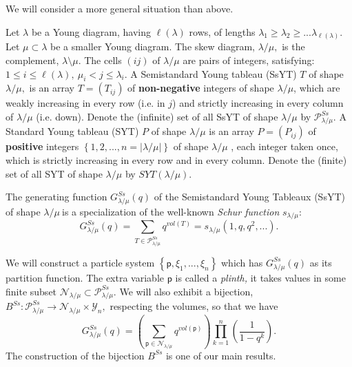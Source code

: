\documentclass[12pt]{article}%
\begin{document}
We will consider a more general situation than above.

Let $\lambda$ be a Young diagram, having $\ell\left(  \lambda\right)  $ rows,
of lengths $\lambda_{1}\geq\lambda_{2}\geq...\lambda_{\ell\left(
\lambda\right)  }$. Let $\mu\subset\lambda$ be a smaller Young diagram. The
skew diagram, $\lambda/\mu,$ is the complement, $\lambda\setminus\mu$. The
cells $\left(  ij\right)  $ of $\lambda/\mu$ are pairs of integers,
satisfying:  $1\leq i\leq\ell\left(  \lambda\right)  ,\ \mu_{i}<j\leq
\lambda_{i}.$ A Semistandard Young tableau (SsYT) $T$ of shape $\lambda/\mu,$
is an array $T=\left(  T_{ij}\right)  $ of \textbf{non-negative} integers of
shape $\lambda/\mu$, which are weakly increasing in every row (i.e. in $j$)
and strictly increasing in every column of $\lambda/\mu$ (i.e. down). Denote
the (infinite) set of all SsYT of shape $\lambda/\mu$ by $\mathcal{P}%
_{\lambda/\mu}^{Ss}.$ A Standard Young tableau (SYT) $P$ of shape $\lambda
/\mu$ is an array $P=\left(  P_{ij}\right)  $ of \textbf{positive} integers
$\left\{  1,2,...,n=\left\vert \lambda/\mu\right\vert \right\}  $ of shape
$\lambda/\mu$ , each integer taken once, which is strictly increasing in every
row and in every column. Denote the (finite) set of all SYT of shape
$\lambda/\mu$ by $SYT\left(  \lambda/\mu\right)  .$

The generating function $G_{\lambda/\mu}^{Ss}\left(  q\right)  $ of the
Semistandard Young Tableaux (SsYT) of shape $\lambda/\mu\ $is a specialization
of the well-known \textit{Schur function} $s_{\lambda/\mu}$:
\[
G_{\lambda/\mu}^{Ss}\left(  q\right)  =\sum_{T\in\mathcal{P}_{\lambda/\mu
}^{Ss}}q^{vol\left(  T\right)  }=s_{\lambda/\mu}\left(  1,q,q^{2},...\right)
.
\]


We will construct a  particle system $\left\{  \mathsf{p},\xi_{1},...,\xi
_{n}\right\}  $ which has $G_{\lambda/\mu}^{Ss}\left(  q\right)  $ as its
partition function. The extra variable $\mathsf{p}$ is called a
\textit{plinth, }it takes values in some finite subset $\mathcal{N}%
_{\lambda/\mu}\subset\mathcal{P}_{\lambda/\mu}^{Ss}.$ We will also exhibit a
bijection, $B^{Ss}:\mathcal{P}_{\lambda/\mu}^{Ss}\rightarrow\mathcal{N}%
_{\lambda/\mu}\times\mathcal{Y}_{n},$ respecting the volumes, so that we have
\begin{equation}
G_{\lambda/\mu}^{Ss}\left(  q\right)  =\left(  \sum_{\mathsf{p}\in
\mathcal{N}_{\lambda/\mu}}q^{vol\left(  \mathsf{p}\right)  }\right)
\prod_{k=1}^{n}\left(  \frac{1}{1-q^{k}}\right)  .\label{26}%
\end{equation}
The construction of the bijection $B^{Ss}$ is one of our main results. 
\end{document}
